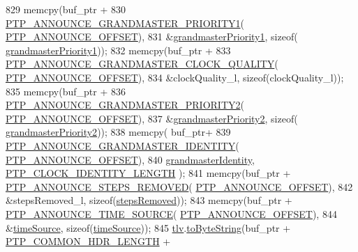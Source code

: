 \begin{DoxyCode}
829     memcpy(buf\_ptr +
830            \hyperlink{avbts__message_8hpp_acd2f076b6ef0a6a45ac42baf1aecd300}{PTP\_ANNOUNCE\_GRANDMASTER\_PRIORITY1}(
      \hyperlink{avbts__message_8hpp_aaa3da4fa4e9e4cfe49477cd7f6b95bca}{PTP\_ANNOUNCE\_OFFSET}),
831            &\hyperlink{class_p_t_p_message_announce_a93988c82dd819cc976c32f9e006b97e3}{grandmasterPriority1}, \textcolor{keyword}{sizeof}(
      \hyperlink{class_p_t_p_message_announce_a93988c82dd819cc976c32f9e006b97e3}{grandmasterPriority1}));
832     memcpy(buf\_ptr +
833            \hyperlink{avbts__message_8hpp_a972816df3b21a89930e21ac6a9617408}{PTP\_ANNOUNCE\_GRANDMASTER\_CLOCK\_QUALITY}(
      \hyperlink{avbts__message_8hpp_aaa3da4fa4e9e4cfe49477cd7f6b95bca}{PTP\_ANNOUNCE\_OFFSET}),
834            &clockQuality\_l, \textcolor{keyword}{sizeof}(clockQuality\_l));
835     memcpy(buf\_ptr +
836            \hyperlink{avbts__message_8hpp_ad08230d0bcb3b40a12153ace07e585f9}{PTP\_ANNOUNCE\_GRANDMASTER\_PRIORITY2}(
      \hyperlink{avbts__message_8hpp_aaa3da4fa4e9e4cfe49477cd7f6b95bca}{PTP\_ANNOUNCE\_OFFSET}),
837            &\hyperlink{class_p_t_p_message_announce_a1e9e3c7867bf9eb557e5cf6edbd7f54a}{grandmasterPriority2}, \textcolor{keyword}{sizeof}(
      \hyperlink{class_p_t_p_message_announce_a1e9e3c7867bf9eb557e5cf6edbd7f54a}{grandmasterPriority2}));
838     memcpy( buf\_ptr+
839         \hyperlink{avbts__message_8hpp_a822a74880e223c13025df7bbfa545b63}{PTP\_ANNOUNCE\_GRANDMASTER\_IDENTITY}(
      \hyperlink{avbts__message_8hpp_aaa3da4fa4e9e4cfe49477cd7f6b95bca}{PTP\_ANNOUNCE\_OFFSET}),
840         \hyperlink{class_p_t_p_message_announce_aac45d13272e7f5bd9b06d2bf44c012af}{grandmasterIdentity}, \hyperlink{ptptypes_8hpp_afd1566058ed7927c2b790c9d4a0051ec}{PTP\_CLOCK\_IDENTITY\_LENGTH} );
841     memcpy(buf\_ptr + \hyperlink{avbts__message_8hpp_ad9e2d7ce4d1384fad376314924fa4cea}{PTP\_ANNOUNCE\_STEPS\_REMOVED}(
      \hyperlink{avbts__message_8hpp_aaa3da4fa4e9e4cfe49477cd7f6b95bca}{PTP\_ANNOUNCE\_OFFSET}),
842            &stepsRemoved\_l, \textcolor{keyword}{sizeof}(\hyperlink{class_p_t_p_message_announce_ab24df4cccbede4b07586878ef0d47395}{stepsRemoved}));
843     memcpy(buf\_ptr + \hyperlink{avbts__message_8hpp_ac69e2a9341554bbbf10612cd50b5f181}{PTP\_ANNOUNCE\_TIME\_SOURCE}(
      \hyperlink{avbts__message_8hpp_aaa3da4fa4e9e4cfe49477cd7f6b95bca}{PTP\_ANNOUNCE\_OFFSET}),
844            &\hyperlink{class_p_t_p_message_announce_a56fd97f48cb931b2450032650f82ef17}{timeSource}, \textcolor{keyword}{sizeof}(\hyperlink{class_p_t_p_message_announce_a56fd97f48cb931b2450032650f82ef17}{timeSource}));
845     \hyperlink{class_p_t_p_message_announce_ac7b185260086ad357ff7a9c29f468936}{tlv}.\hyperlink{class_path_trace_t_l_v_acd2477c3b4df4f055d57ceae73e545a0}{toByteString}(buf\_ptr + \hyperlink{avbts__message_8hpp_a8ec4d965b7b1e83844f1c17f12e9b8e4}{PTP\_COMMON\_HDR\_LENGTH} + 

\end{DoxyCode}
